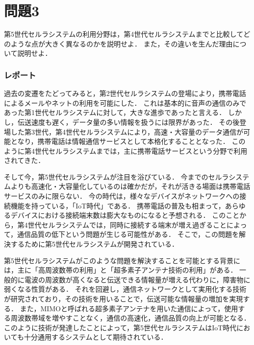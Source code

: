 \section*{問題3}
第5世代セルラシステムの利用分野は，第4世代セルラシステムまでと比較してどのような点が大きく異なるのかを説明せよ．
また，その違いを生んだ理由について説明せよ．

\subsubsection*{レポート}
過去の変遷をたどってみると，第2世代セルラシステムの登場により，携帯電話によるメールやネットの利用を可能にした．
これは基本的に音声の通信のみであった第1世代セルラシステムに対して，大きな進歩であったと言える．
しかし，伝送速度も遅く，データ量の多い情報を扱うには限界があった．
その後登場した第3世代，第4世代セルラシステムにより，高速・大容量のデータ通信が可能となり，携帯電話は情報通信サービスとして本格化することとなった．
このように第4世代セルラシステムまでは，主に携帯電話サービスという分野で利用されてきた．\par
そして今，第5世代セルラシステムが注目を浴びている．
今までのセルラシステムよりも高速化・大容量化しているのは確かだが，それが活きる場面は携帯電話サービスのみに限らない．
今の時代は，様々なデバイスがネットワークへの接続機能を持っている，「IoT時代」である．
携帯電話の普及も相まって，あらゆるデバイスにおける接続端末数は膨大なものになると予想される．
このことから，第4世代セルラシステムでは，同時に接続する端末が増え過ぎることによって，通信品質の低下という問題が生じる可能性がある．
そこで，この問題を解決するために第5世代セルラシステムが開発されている．\par
第5世代セルラシステムがこのような問題を解決することを可能とする背景には，主に「高周波数帯の利用」と「超多素子アンテナ技術の利用」がある．
一般的に電波の周波数が高くなると伝送できる情報量が増える代わりに，障害物に弱くなる性質がある．
それを回避し，通信ネットワークとして実用化する技術が研究されており，その技術を用いることで，伝送可能な情報量の増加を実現する．
また，MIMOと呼ばれる超多素子アンテナを用いた通信によって，使用する周波数帯域を増やすことなく，通信の高速化，通信品質の向上が可能となる．
このように技術が発達したことによって，第5世代セルラシステムはIoT時代においても十分通用するシステムとして期待されている．
